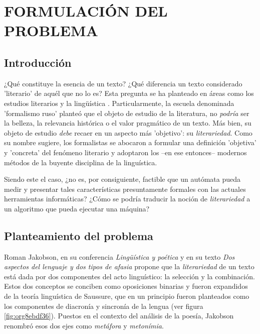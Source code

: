 \documentclass[12pt,letterpaper,twoside]{article}
\begin{document}
\section{FORMULACIÓN DEL PROBLEMA}
\label{sec:org61919f8}
\subsection{Introducción}
\label{sec:org0a0af32}

¿Qué constituye la esencia de un texto? ¿Qué diferencia un texto
considerado 'literario' de aquél que no lo es? Esta pregunta se ha
planteado en áreas como los estudios literarios y la lingüística
\cite{eijembaum2010teoria}. Particularmente, la escuela denominada
'formalismo ruso' planteó que el objeto de estudio de la literatura,
no \emph{podría} ser la belleza, la relevancia histórica o el valor
pragmático de un texto. Más bien, su objeto de estudio \emph{debe} recaer
en un aspecto más 'objetivo': su \emph{literariedad}.  Como su nombre
sugiere, los formalistas se abocaron a formular una definición
'objetiva' y 'concreta' del fenómeno literario y adoptaron los --en
ese entonces-- modernos métodos de la buyente disciplina de la
linguística.

Siendo este el caso, ¿no es, por consiguiente, factible que un
autómata pueda medir y presentar tales características presuntamente
formales con las actuales herramientas informáticas? ¿Cómo se podría
traducir la noción de \emph{literariedad} a un algoritmo que pueda ejecutar
una máquina?


\subsection{Planteamiento del problema}
\label{sec:orgcc02e84}

Roman Jakobson, en su conferencia \emph{Lingüística y poética}
\cite{jakobson1981linguistica} y en su texto \emph{Dos aspectos del lenguaje y dos
tipos de afasia} \cite{jakobson1956two} propone que la
\emph{literariedad} de un texto está dada por dos componentes del acto
linguístico: la selección y la combinación. Estos dos conceptos se
conciben como oposiciones binarias y fueron expandidos de la
teoría linguística de Saussure, que en un principio fueron
planteados como los componentes de diacronía y sincronía de la
lengua (ver figura \ref{fig:org8ebdf36}). Puestos en el contexto del
análisis de la poesía, Jakobson renombró esos dos ejes como
\emph{metáfora} y \emph{metonímia}.
\end{document}
